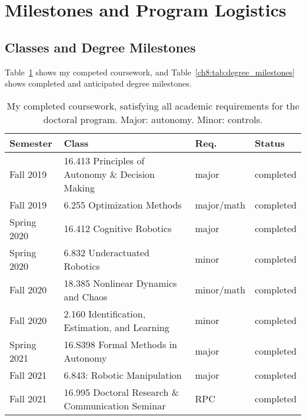 
\section{Milestones and Program Logistics}

\subsection{Classes and Degree Milestones}

Table~\ref{ch8:tab:course_requirements} shows my competed coursework, and Table~\ref{ch8:tab:degree_milestones} shows completed and anticipated degree milestones.

\begin{table}[h]
\centering
\caption{My completed coursework, satisfying all academic requirements for the doctoral program. Major: autonomy. Minor: controls.}
\label{ch8:tab:course_requirements}
\begin{tabular}{llll}
Semester    & Class                                             & Req.       & Status    \\ \hline
Fall 2019   & 16.413 Principles of Autonomy \& Decision Making  & major      & completed \\
Fall 2019   & 6.255 Optimization Methods                        & major/math & completed \\
Spring 2020 & 16.412 Cognitive Robotics                         & major      & completed \\
Spring 2020 & 6.832 Underactuated Robotics                      & minor      & completed \\
Fall 2020   & 18.385 Nonlinear Dynamics and Chaos               & minor/math & completed \\
Fall 2020   & 2.160 Identification, Estimation, and Learning    & minor      & completed \\
Spring 2021 & 16.S398 Formal Methods in Autonomy                & major      & completed \\
Fall 2021   & 6.843: Robotic Manipulation                       & major      & completed \\
Fall 2021   & 16.995 Doctoral Research \& Communication Seminar & RPC        & completed
\end{tabular}
\end{table}

